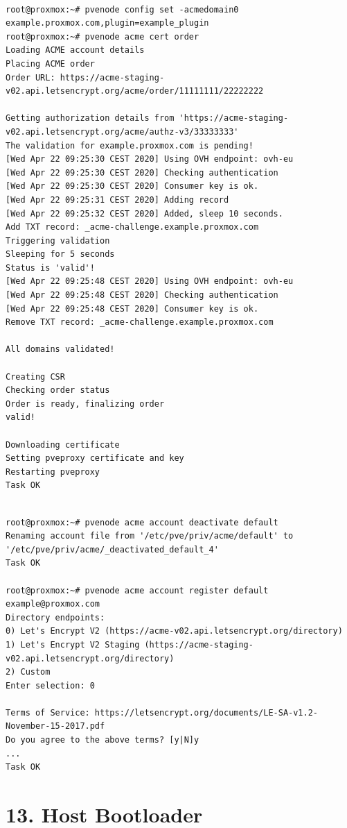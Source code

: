\begin{lstlisting}

root@proxmox:~# pvenode config set -acmedomain0 example.proxmox.com,plugin=example_plugin
root@proxmox:~# pvenode acme cert order
Loading ACME account details
Placing ACME order
Order URL: https://acme-staging-v02.api.letsencrypt.org/acme/order/11111111/22222222

Getting authorization details from 'https://acme-staging-v02.api.letsencrypt.org/acme/authz-v3/33333333'
The validation for example.proxmox.com is pending!
[Wed Apr 22 09:25:30 CEST 2020] Using OVH endpoint: ovh-eu
[Wed Apr 22 09:25:30 CEST 2020] Checking authentication
[Wed Apr 22 09:25:30 CEST 2020] Consumer key is ok.
[Wed Apr 22 09:25:31 CEST 2020] Adding record
[Wed Apr 22 09:25:32 CEST 2020] Added, sleep 10 seconds.
Add TXT record: _acme-challenge.example.proxmox.com
Triggering validation
Sleeping for 5 seconds
Status is 'valid'!
[Wed Apr 22 09:25:48 CEST 2020] Using OVH endpoint: ovh-eu
[Wed Apr 22 09:25:48 CEST 2020] Checking authentication
[Wed Apr 22 09:25:48 CEST 2020] Consumer key is ok.
Remove TXT record: _acme-challenge.example.proxmox.com

All domains validated!

Creating CSR
Checking order status
Order is ready, finalizing order
valid!

Downloading certificate
Setting pveproxy certificate and key
Restarting pveproxy
Task OK

\end{lstlisting}

\begin{lstlisting}

root@proxmox:~# pvenode acme account deactivate default
Renaming account file from '/etc/pve/priv/acme/default' to '/etc/pve/priv/acme/_deactivated_default_4'
Task OK

root@proxmox:~# pvenode acme account register default example@proxmox.com
Directory endpoints:
0) Let's Encrypt V2 (https://acme-v02.api.letsencrypt.org/directory)
1) Let's Encrypt V2 Staging (https://acme-staging-v02.api.letsencrypt.org/directory)
2) Custom
Enter selection: 0

Terms of Service: https://letsencrypt.org/documents/LE-SA-v1.2-November-15-2017.pdf
Do you agree to the above terms? [y|N]y
...
Task OK

\end{lstlisting}


\section{13. Host Bootloader}

